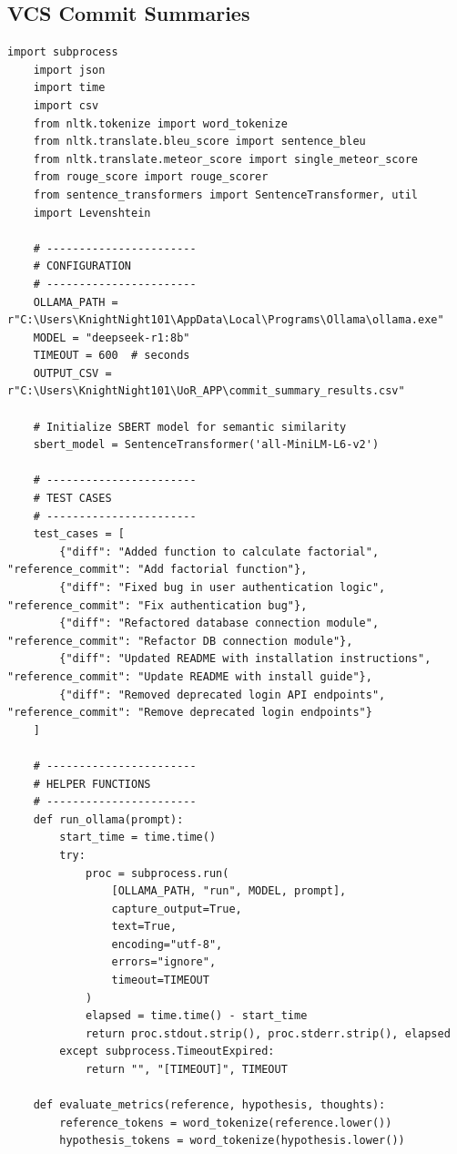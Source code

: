 \documentclass{report}
\begin{document}
\subsection{VCS Commit Summaries}
\begin{lstlisting}[style=pythonstyle]
    import subprocess
    import json
    import time
    import csv
    from nltk.tokenize import word_tokenize
    from nltk.translate.bleu_score import sentence_bleu
    from nltk.translate.meteor_score import single_meteor_score
    from rouge_score import rouge_scorer
    from sentence_transformers import SentenceTransformer, util
    import Levenshtein

    # -----------------------
    # CONFIGURATION
    # -----------------------
    OLLAMA_PATH = r"C:\Users\KnightNight101\AppData\Local\Programs\Ollama\ollama.exe"
    MODEL = "deepseek-r1:8b"
    TIMEOUT = 600  # seconds
    OUTPUT_CSV = r"C:\Users\KnightNight101\UoR_APP\commit_summary_results.csv"

    # Initialize SBERT model for semantic similarity
    sbert_model = SentenceTransformer('all-MiniLM-L6-v2')

    # -----------------------
    # TEST CASES
    # -----------------------
    test_cases = [
        {"diff": "Added function to calculate factorial", "reference_commit": "Add factorial function"},
        {"diff": "Fixed bug in user authentication logic", "reference_commit": "Fix authentication bug"},
        {"diff": "Refactored database connection module", "reference_commit": "Refactor DB connection module"},
        {"diff": "Updated README with installation instructions", "reference_commit": "Update README with install guide"},
        {"diff": "Removed deprecated login API endpoints", "reference_commit": "Remove deprecated login endpoints"}
    ]

    # -----------------------
    # HELPER FUNCTIONS
    # -----------------------
    def run_ollama(prompt):
        start_time = time.time()
        try:
            proc = subprocess.run(
                [OLLAMA_PATH, "run", MODEL, prompt],
                capture_output=True,
                text=True,
                encoding="utf-8",
                errors="ignore",
                timeout=TIMEOUT
            )
            elapsed = time.time() - start_time
            return proc.stdout.strip(), proc.stderr.strip(), elapsed
        except subprocess.TimeoutExpired:
            return "", "[TIMEOUT]", TIMEOUT

    def evaluate_metrics(reference, hypothesis, thoughts):
        reference_tokens = word_tokenize(reference.lower())
        hypothesis_tokens = word_tokenize(hypothesis.lower())


\end{lstlisting}
\end{document}
